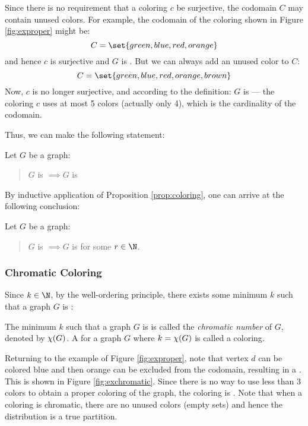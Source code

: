 Since there is no requirement that a coloring \(c\) be surjective, the codomain \(C\) may contain unused colors.
For example, the codomain of the coloring shown in Figure \ref{fig:exproper} might be:
\[C=\set{green,blue,red,orange}\]
and hence \(c\) is surjective and \(G\) is .  But we can always add an unused color to \(C\):
\[C=\set{green,blue,red,orange,brown}\]
Now, \(c\) is no longer surjective, and according to the definition: \(G\) is  --- the coloring \(c\)
uses at most 5 colors (actually only 4), which is the cardinality of the codomain.

Thus, we can make the following statement:

\begin{proposition}
  \label{prop:coloring}
  Let \(G\) be a graph:
  \begin{quote}
    \(G\) is  \(\implies G\) is 
  \end{quote}
\end{proposition}

By inductive application of Proposition \ref{prop:coloring}, one can arrive at the following conclusion:

\begin{proposition}
  \label{prop:coloring2}
  Let \(G\) be a graph:
  \begin{quote}
    \(G\) is  \(\implies G\) is  for some \(r\in\N\).
  \end{quote}
\end{proposition}

\subsubsection{Chromatic Coloring}

Since \(k\in\N\), by the well-ordering principle, there exists some minimum \(k\) such that a graph \(G\) is
:

\begin{definition}
  The minimum \(k\) such that a graph \(G\) is  is called the \emph{chromatic number} of \(G\), denoted
  by \(\chi(G)\).  A  for a graph \(G\) where \(k=\chi(G)\) is called a \emph{} coloring.
\end{definition}

Returning to the example  of Figure \ref{fig:exproper}, note that vertex \(d\) can be colored blue and
then orange can be excluded from the codomain, resulting in a .  This is shown in Figure
\ref{fig:exchromatic}.  Since there is no way to use less than 3 colors to obtain a proper coloring of the graph,
the coloring is .  Note that when a coloring is chromatic, there are no unused colors (empty sets) and
hence the distribution is a true partition.

